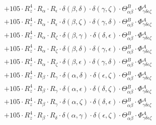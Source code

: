 \documentclass{article}
\begin{document}
\begin{equation}
\begin{array}{c}
 \\[0.2em] 		 + 105 \cdot R_{z}^{4} \cdot R_{\alpha{}} \cdot R_{\epsilon{}} \cdot \delta{}\left(\beta{}, \delta{}\right) \cdot \delta{}\left(\gamma{}, \zeta{}\right) \cdot \Theta{}^{B}_{\alpha{}\beta{}} \cdot \Phi{}^{A}_{\gamma{}\delta{}\epsilon{}\zeta{}} 
 \\[0.2em] 		 + 105 \cdot R_{z}^{4} \cdot R_{\alpha{}} \cdot R_{\epsilon{}} \cdot \delta{}\left(\beta{}, \zeta{}\right) \cdot \delta{}\left(\gamma{}, \delta{}\right) \cdot \Theta{}^{B}_{\alpha{}\beta{}} \cdot \Phi{}^{A}_{\gamma{}\delta{}\epsilon{}\zeta{}} 
 \\[0.2em] 		 + 105 \cdot R_{z}^{4} \cdot R_{\alpha{}} \cdot R_{\zeta{}} \cdot \delta{}\left(\beta{}, \gamma{}\right) \cdot \delta{}\left(\delta{}, \epsilon{}\right) \cdot \Theta{}^{B}_{\alpha{}\beta{}} \cdot \Phi{}^{A}_{\gamma{}\delta{}\epsilon{}\zeta{}} 
 \\[0.2em] 		 + 105 \cdot R_{z}^{4} \cdot R_{\alpha{}} \cdot R_{\zeta{}} \cdot \delta{}\left(\beta{}, \delta{}\right) \cdot \delta{}\left(\gamma{}, \epsilon{}\right) \cdot \Theta{}^{B}_{\alpha{}\beta{}} \cdot \Phi{}^{A}_{\gamma{}\delta{}\epsilon{}\zeta{}} 
 \\[0.2em] 		 + 105 \cdot R_{z}^{4} \cdot R_{\alpha{}} \cdot R_{\zeta{}} \cdot \delta{}\left(\beta{}, \epsilon{}\right) \cdot \delta{}\left(\gamma{}, \delta{}\right) \cdot \Theta{}^{B}_{\alpha{}\beta{}} \cdot \Phi{}^{A}_{\gamma{}\delta{}\epsilon{}\zeta{}} 
 \\[0.2em] 		 + 105 \cdot R_{z}^{4} \cdot R_{\beta{}} \cdot R_{\gamma{}} \cdot \delta{}\left(\alpha{}, \delta{}\right) \cdot \delta{}\left(\epsilon{}, \zeta{}\right) \cdot \Theta{}^{B}_{\alpha{}\beta{}} \cdot \Phi{}^{A}_{\gamma{}\delta{}\epsilon{}\zeta{}} 
 \\[0.2em] 		 + 105 \cdot R_{z}^{4} \cdot R_{\beta{}} \cdot R_{\gamma{}} \cdot \delta{}\left(\alpha{}, \epsilon{}\right) \cdot \delta{}\left(\delta{}, \zeta{}\right) \cdot \Theta{}^{B}_{\alpha{}\beta{}} \cdot \Phi{}^{A}_{\gamma{}\delta{}\epsilon{}\zeta{}} 
 \\[0.2em] 		 + 105 \cdot R_{z}^{4} \cdot R_{\beta{}} \cdot R_{\gamma{}} \cdot \delta{}\left(\alpha{}, \zeta{}\right) \cdot \delta{}\left(\delta{}, \epsilon{}\right) \cdot \Theta{}^{B}_{\alpha{}\beta{}} \cdot \Phi{}^{A}_{\gamma{}\delta{}\epsilon{}\zeta{}} 
 \\[0.2em] 		 + 105 \cdot R_{z}^{4} \cdot R_{\beta{}} \cdot R_{\delta{}} \cdot \delta{}\left(\alpha{}, \gamma{}\right) \cdot \delta{}\left(\epsilon{}, \zeta{}\right) \cdot \Theta{}^{B}_{\alpha{}\beta{}} \cdot \Phi{}^{A}_{\gamma{}\delta{}\epsilon{}\zeta{}} 

\end{array}
\end{equation}
\end{document}
